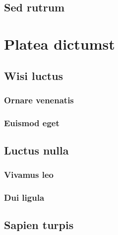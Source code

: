 \subsection{Sed rutrum} \lipsum[11-12]


\section{Platea dictumst} \lipsum[13-14]

\subsection{Wisi luctus} \lipsum[15]
\subsubsection{Ornare venenatis} \lipsum[16]
\subsubsection{Euismod eget} \lipsum[17]
\subsection{Luctus nulla} \lipsum [18]
\subsubsection{Vivamus leo} \lipsum[19]
\subsubsection{Dui ligula} \lipsum[20]
\subsection{Sapien turpis} \lipsum [21-22]

